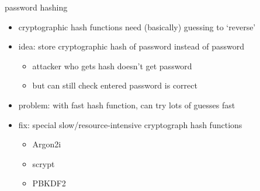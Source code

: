 \begin{frame}{password hashing}
    \begin{itemize}
        \item cryptographic hash functions need (basically) guessing to `reverse'
        \item idea: store cryptographic hash of password instead of password
            \begin{itemize}
            \item attacker who gets hash doesn't get password
            \item but can still check entered password is correct
            \end{itemize}
            \vspace{.5cm}
        \item<2-> problem: with fast hash function, can try lots of guesses fast
        \item<3-> fix: special slow/resource-intensive cryptograph hash functions
            \begin{itemize}
            \item Argon2i
            \item scrypt
            \item PBKDF2
            \end{itemize}
    \end{itemize}
\end{frame}
